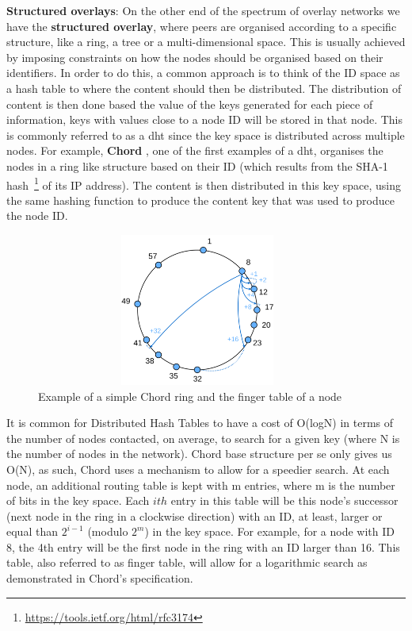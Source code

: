 \textbf{Structured overlays}: On the other end of the spectrum of overlay
networks we have the \textbf{structured overlay}, where peers are organised
according to a specific structure, like a ring, a tree or a multi-dimensional
space. This is usually achieved by imposing constraints on how the nodes should
be organised based on their identifiers. In order to do this, a common approach
is to think of the ID space as a hash table to where the content should then be
distributed. The distribution of content is then done based the value of the
keys generated for each piece of information, keys with values close to a node
ID will be stored in that node. This is commonly referred to as a \acrfull{dht}
since the key space is distributed across multiple nodes. For example,
\textbf{Chord} \cite{Stoica2001}, one of the first examples of a
\acrshort{dht}, organises the nodes in a ring like structure based on their ID
(which results from the SHA-1
hash~\footnote{\url{https://tools.ietf.org/html/rfc3174}} of its IP address). The
content is then distributed in this key space, using the same hashing function
to produce the content key that was used to produce the node ID.

\begin{figure}[hb!]
  \centering
  \includegraphics[max height=5cm,max width=0.95\textwidth]{img/chord.png}
  \caption{Example of a simple Chord ring and the finger table of a node}
  \label{fig:chord}
\end{figure}

It is common for Distributed Hash Tables to have a cost of O(log{}N) in terms
of the number of nodes contacted, on average, to search for a given key (where
N is the number of nodes in the network). Chord base structure per se only
gives us O(N), as such, Chord uses a mechanism to allow for a speedier search.
At each node, an additional routing table is kept with m entries, where m is
the number of bits in the key space. Each $ith$ entry in this table will be
this node's successor (next node in the ring in a clockwise direction) with an
ID, at least, larger or equal than $2^{i-1}$ (modulo $2^{m}$) in the key space.
For example, for a node with ID 8, the 4th entry will be the first node in the
ring with an ID larger than 16. This table, also referred to as finger table,
will allow for a logarithmic search as demonstrated in Chord's specification.

